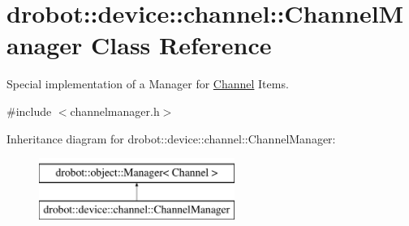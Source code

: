 \hypertarget{classdrobot_1_1device_1_1channel_1_1ChannelManager}{\section{drobot\-:\-:device\-:\-:channel\-:\-:Channel\-Manager Class Reference}
\label{classdrobot_1_1device_1_1channel_1_1ChannelManager}
}


Special implementation of a Manager for \hyperlink{classdrobot_1_1device_1_1channel_1_1Channel}{Channel} Items.  




{\ttfamily \#include $<$channelmanager.\-h$>$}

Inheritance diagram for drobot\-:\-:device\-:\-:channel\-:\-:Channel\-Manager\-:\begin{figure}[H]
\begin{center}
\leavevmode
\includegraphics[height=2.000000cm]{classdrobot_1_1device_1_1channel_1_1ChannelManager}
\end{center}
\end{figure}
